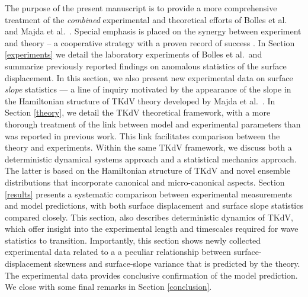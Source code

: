 \documentclass[11pt]{article}
\begin{document}
The purpose of the present manuscript is to provide a more comprehensive treatment of the {\em combined} experimental and theoretical efforts of Bolles et al.~\cite{bolles2019} and Majda et al.~\cite{majda2019, majdaqi2019}. Special emphasis is placed on the synergy between experiment and theory -- a cooperative strategy with a proven record of success \cite{camassa2012stratified, ristroph2012, ganedi2018equilibrium}. 
In Section \ref{experiments} we detail the laboratory experiments of Bolles et al.~and summarize previously reported findings on anomalous statistics of the surface displacement. In this section, we also present new experimental data on surface {\em slope} statistics --- a line of inquiry motivated by the appearance of the slope in the Hamiltonian structure of TKdV theory developed by Majda et al.~\cite{majda2019}.
In Section \ref{theory}, we detail the TKdV theoretical framework, with a more thorough treatment of the link between model and experimental parameters than was reported in previous work. This link facilitates comparison between the theory and experiments. Within the same TKdV framework, we discuss both a deterministic dynamical systems approach and a statistical mechanics approach. The latter is based on the Hamiltonian structure of TKdV and novel ensemble distributions that incorporate canonical and micro-canonical aspects.
Section \ref{results} presents a systematic comparison between experimental measurements and model predictions, with both surface displacement and surface slope statistics compared closely. This section, also describes deterministic dynamics of TKdV, which offer insight into the experimental length and timescales required for wave statistics to transition. Importantly, this section shows newly collected experimental data related to a a peculiar relationship between surface-displacement skewness and surface-slope variance that is predicted by the theory. The experimental data provides conclusive confirmation of the model prediction. We close with some final remarks in Section \ref{conclusion}.


\end{document}
